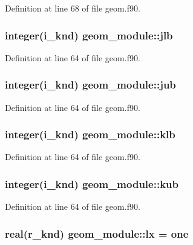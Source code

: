 Definition at line 68 of file geom.\-f90.

\hypertarget{classgeom__module_a87c8f8859d2d98c1dfc36f0ccf4208df}{
\subsubsection[{jlb}]{\setlength{\rightskip}{0pt plus 5cm}integer(i\-\_\-knd) geom\-\_\-module\-::jlb}}\label{classgeom__module_a87c8f8859d2d98c1dfc36f0ccf4208df}


Definition at line 64 of file geom.\-f90.

\hypertarget{classgeom__module_ada7a9e753e21b30a06f0858f5deb4300}{
\subsubsection[{jub}]{\setlength{\rightskip}{0pt plus 5cm}integer(i\-\_\-knd) geom\-\_\-module\-::jub}}\label{classgeom__module_ada7a9e753e21b30a06f0858f5deb4300}


Definition at line 64 of file geom.\-f90.

\hypertarget{classgeom__module_a7c3abb8b57ed30570288a1da71db8444}{
\subsubsection[{klb}]{\setlength{\rightskip}{0pt plus 5cm}integer(i\-\_\-knd) geom\-\_\-module\-::klb}}\label{classgeom__module_a7c3abb8b57ed30570288a1da71db8444}


Definition at line 64 of file geom.\-f90.

\hypertarget{classgeom__module_a79842b1abc678e999d926bc361620371}{
\subsubsection[{kub}]{\setlength{\rightskip}{0pt plus 5cm}integer(i\-\_\-knd) geom\-\_\-module\-::kub}}\label{classgeom__module_a79842b1abc678e999d926bc361620371}


Definition at line 64 of file geom.\-f90.

\hypertarget{classgeom__module_a1fe9e4dc8297fc98198b561000a97973}{
\subsubsection[{lx}]{\setlength{\rightskip}{0pt plus 5cm}real(r\-\_\-knd) geom\-\_\-module\-::lx = one}}\label{classgeom__module_a1fe9e4dc8297fc98198b561000a97973}


